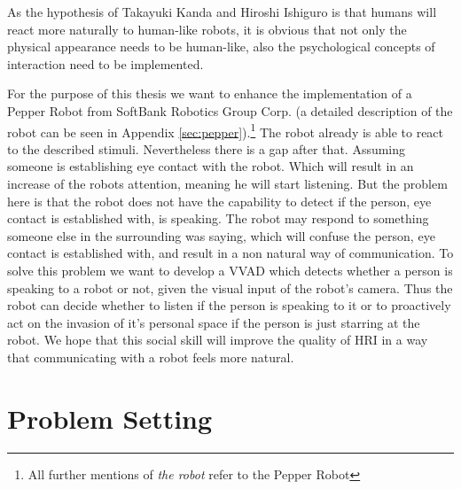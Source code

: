 As the hypothesis of Takayuki Kanda and Hiroshi Ishiguro is that humans will react more naturally to human-like robots, it is obvious that not only the physical appearance needs to be human-like, also the psychological concepts of interaction need to be implemented.

For the purpose of this thesis we want to enhance the implementation of a Pepper Robot from SoftBank Robotics Group Corp. (a detailed description of the robot can be seen in Appendix \ref{sec:pepper}).\footnote{All further mentions of \emph{the robot} refer to the Pepper Robot}
The robot already is able to react to the described stimuli. Nevertheless there is a gap after that.
Assuming someone is establishing eye contact with the robot.
Which will result in an increase of the robots attention, meaning he will start listening.
But the problem here is that the robot does not have the capability to detect if the person, eye contact is established with, is speaking.
The robot may respond to something someone else in the surrounding was saying, which will confuse the person, eye contact is established with, and result in a non natural way of communication.
To solve this problem we want to develop a VVAD which detects whether a person is speaking to a robot or not, given the visual input of the robot's camera. Thus the robot can decide whether to listen if the person is speaking to it or to proactively act on the invasion of it's personal space if the person is just starring at the robot.
We hope that this social skill will improve the quality of HRI in a way that communicating with a robot feels more natural.




\section{Problem Setting}\label{sec:problem}

